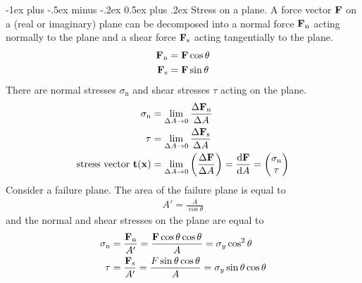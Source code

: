 \documentclass[10pt,landscape,a4paper]{article}
\makeatletter
\renewcommand\d{\mathop{}\!\mathrm{d}}
\renewcommand{\section}{\@startsection{section}{1}{0mm}%
	{-1ex plus -.5ex minus -.2ex}%
	{0.5ex plus .2ex}%
	{\normalfont\large\bfseries}}
\makeatother
\begin{document}
\begin{multicols}{3}
		\section{Stress on a plane.}
		A force vector $ \vb{F} $ on a (real or imaginary) plane can be decomposed into a normal force $ \vb{F}_\text{n} $ acting normally to the plane and a shear force $ \vb{F}_\text{s} $ acting tangentially to the plane.
			\begin{align*}
				\vb{F}_\text{n}&=\vb{F}\cos\theta \\
				\vb{F}_\text{s}&=\vb{F}\sin\theta 
			\end{align*}
		There are normal stresses $ \sigma_\text{n} $ and shear stresses $ \tau $ acting on the plane.
			\begin{align*}
				\sigma_\text{n}&=\lim_{\Delta A\rightarrow0}\frac{\Delta\vb{F}_\text{n}}{\Delta A}\\
				\tau&=\lim_{\Delta A\rightarrow0}\frac{\Delta\vb{F}_\text{s}}{\Delta A}\\
				\text{stress vector} \ \vb{t}(\vb{x})&=\lim_{\Delta A\rightarrow0}\left(\frac{\Delta\vb{F}}{\Delta A}\right)=\frac{\vb{\d F}}{\d A}=\begin{pmatrix}\sigma_\text{n}\\\tau\end{pmatrix}
			\end{align*}
		Consider a failure plane. The area of the failure plane is equal to
			\begin{align*}
				A'=\frac{A}{\cos\theta}
			\end{align*}
		and the normal and shear stresses on the plane are equal to
			\begin{align*}
				\sigma_\text{n}&=\frac{\vb{F}_\text{n}}{A'}=\frac{\vb{F}\cos\theta\cos\theta}{A}=\sigma_y\cos^2\theta\\
				\tau&=\frac{\vb{F}_\text{s}}{A'}=\frac{F\sin\theta\cos\theta}{A}=\sigma_y\sin\theta\cos\theta
			\end{align*}
		

\end{multicols}
\end{document}
